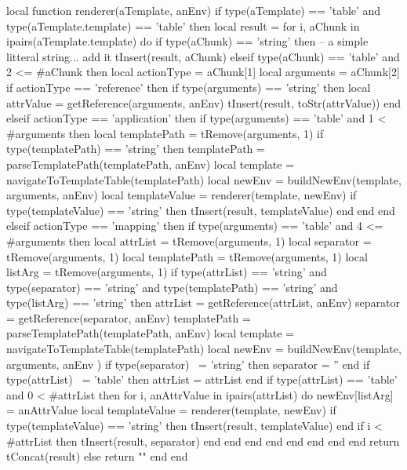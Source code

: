 {{\startLuaCode
local function renderer(aTemplate, anEnv)
  if type(aTemplate) == 'table' and
     type(aTemplate.template) == 'table' then
    local result = { }
    for i, aChunk in ipairs(aTemplate.template) do
      if type(aChunk) == 'string' then
        -- a simple litteral string... add it
        tInsert(result, aChunk)
      elseif type(aChunk) == 'table' and 2 <= #aChunk then
        local actionType = aChunk[1]
        local arguments  = aChunk[2]
        if actionType == 'reference' then
          if type(arguments) == 'string' then
            local attrValue = getReference(arguments, anEnv)
            tInsert(result, toStr(attrValue))
          end
        elseif actionType == 'application' then
          if type(arguments) == 'table' and 1 < #arguments then
            local templatePath = tRemove(arguments, 1)
            if type(templatePath) == 'string' then
              templatePath   = parseTemplatePath(templatePath, anEnv)
              local template = navigateToTemplateTable(templatePath)
              local newEnv   = buildNewEnv(template, arguments, anEnv)
              local templateValue = renderer(template, newEnv)
              if type(templateValue) == 'string' then
                tInsert(result, templateValue)
              end
            end
          end
        elseif actionType == 'mapping' then
          if type(arguments) == 'table' and 4 <= #arguments then
            local attrList     = tRemove(arguments, 1)
            local separator    = tRemove(arguments, 1)
            local templatePath = tRemove(arguments, 1)
            local listArg      = tRemove(arguments, 1)
            if type(attrList)     == 'string' and
               type(separator)    == 'string' and
               type(templatePath) == 'string' and
               type(listArg)      == 'string' then
              attrList       = getReference(attrList,  anEnv)
              separator      = getReference(separator, anEnv)
              templatePath   = parseTemplatePath(templatePath, anEnv)
              local template = navigateToTemplateTable(templatePath)
              local newEnv   = buildNewEnv(template, arguments, anEnv )
              if type(separator) ~= 'string' then
                separator = ''
              end
              if type(attrList) ~= 'table' then
                attrList = { attrList }
              end
              if type(attrList) == 'table' and 0 < #attrList then
                for i, anAttrValue in ipairs(attrList) do
                  newEnv[listArg] = anAttrValue
                  local templateValue = renderer(template, newEnv)
                  if type(templateValue) == 'string' then
                    tInsert(result, templateValue)
                  end
                  if i < #attrList then
                    tInsert(result, separator)
                  end
                end
              end
            end
          end
        end
      end
    end
    return tConcat(result)
  else
    return ""
  end
end

}}
